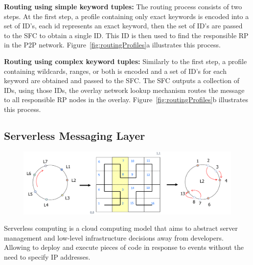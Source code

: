 \textbf{Routing using simple keyword tuples:} The routing process consists of two steps. At the first step, a profile containing only exact keywords is encoded into a set of ID's, each id represents an exact keyword, then the set of ID's are passed to the SFC to obtain a single ID. This ID is then  used to find the responsible RP in the P2P network. Figure~\ref{fig:routingProfiles}a illustrates this process. \vspace{1ex} 

\textbf{Routing using complex keyword tuples:} Similarly to the first step, a profile containing wildcards, ranges, or both is encoded and a set of ID's for each keyword are obtained and passed to the SFC. The SFC outputs a collection of IDs, using those IDs, the overlay network lookup mechanism routes the message to all responsible RP nodes in the overlay. Figure~\ref{fig:routingProfiles}b illustrates this process.


\subsection{Serverless Messaging Layer}\label{sec:serverless}

\begin{figure}[!h]
  \centering
  \includegraphics[width=0.9\columnwidth]{Figures/multi-old.pdf}
  \caption{}\label{fig:Multiquad}
\end{figure}

Serverless computing is a cloud computing model that aims to abstract server management and low-level infrastructure decisions away from developers. Allowing to deploy and execute pieces of code in response to events without the need to specify IP addresses.

